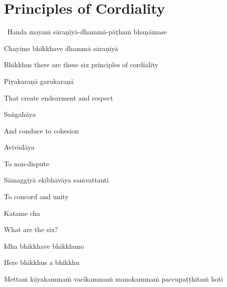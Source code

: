 \suttaRef{[AN 4.180]}


\section{Principles of Cordiality}
\label{principles-of-cordiality}

\begin{leader}
  \anglebracketleft\ \hspace{-0.5mm}Handa mayaṁ sāraṇīyā-dhammā-pāṭhaṁ bhaṇāmase \hspace{-0.5mm}\anglebracketright\
\end{leader}

Chayime bhikkhave dhammā sāraṇīyā

\begin{english}
  Bhikkhus there are these six principles of cordiality
\end{english}

Piyakaraṇā garukaraṇā

\begin{english}
  That create endearment and respect
\end{english}

Saṅgahāya

\begin{english}
  And conduce to cohesion
\end{english}

Avivādāya

\begin{english}
  To non-dispute
\end{english}

Sāmaggiyā ekībhāvāya saṁvattanti

\begin{english}
  To concord and unity
\end{english}

Katame cha

\begin{english}
  What are the six?
\end{english}

Idha bhikkhave bhikkhuno

\begin{english}
  Here bhikkhus a bhikkhu
\end{english}

\begin{pali-hang}
  Mettaṁ kāyakammaṁ vacīkammaṁ manokammaṁ paccupaṭṭhitaṁ hoti
\end{pali-hang}

